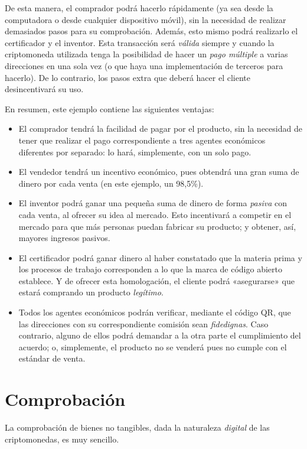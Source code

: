\documentclass[12pt,a4paper]{article}
\begin{document}
De esta manera, el comprador podrá hacerlo rápidamente (ya sea desde la computadora o desde cualquier dispositivo móvil), sin la necesidad de realizar demasiados pasos para su comprobación. Además, esto mismo podrá realizarlo el certificador y el inventor. Esta transacción será \textit{válida} siempre y cuando la criptomoneda utilizada tenga la posibilidad de hacer un \textit{pago múltiple} a varias direcciones en una sola vez (o que haya una implementación de terceros para hacerlo). De lo contrario, los pasos extra que deberá hacer el cliente desincentivará su uso.

En resumen, este ejemplo contiene las siguientes ventajas:

\begin{itemize}
\item El comprador tendrá la facilidad de pagar por el producto, sin la necesidad de tener que realizar el pago correspondiente a tres agentes económicos diferentes por separado: lo hará, simplemente, con un solo pago.
\item El vendedor tendrá un incentivo económico, pues obtendrá una gran suma de dinero por cada venta (en este ejemplo, un 98,5\%).
\item El inventor podrá ganar una pequeña suma de dinero de forma \textit{pasiva} con cada venta, al ofrecer su idea al mercado. Esto incentivará a competir en el mercado para que más personas puedan fabricar su producto; y obtener, así, mayores ingresos pasivos.
\item El certificador podrá ganar dinero al haber constatado que la materia prima y los procesos de trabajo corresponden a lo que la marca de código abierto establece. Y de ofrecer esta homologación, el cliente podrá «asegurarse» que estará comprando un producto \textit{legítimo}.
\item Todos los agentes económicos podrán verificar, mediante el código QR, que las direcciones con su correspondiente comisión sean \textit{fidedignas}. Caso contrario, alguno de ellos podrá demandar a la otra parte el cumplimiento del acuerdo; o, simplemente, el producto no se venderá pues no cumple con el estándar de venta.
\end{itemize}

\section{Comprobación}
La comprobación de bienes no tangibles, dada la naturaleza \textit{digital} de las criptomonedas, es muy sencillo.
\end{document}
